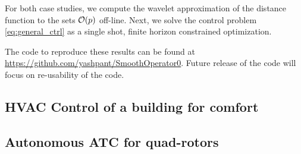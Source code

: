 For both case studies, we compute the wavelet approximation of the distance function to the sets $\mathcal{O}(p)$ off-line. 
Next, we solve the control problem \eqref{eq:general_ctrl} as a single shot, finite horizon constrained optimization. 

The code to reproduce these results can be found at \protect\url{https://github.com/yashpant/SmoothOperator0}. Future release of the code will focus on re-usability of the code. %


\vspace{-5pt}
\subsection{HVAC Control of a building for comfort}

\vspace{-11pt}
\subsection{Autonomous ATC for quad-rotors}
\label{sec:ATCquad}

